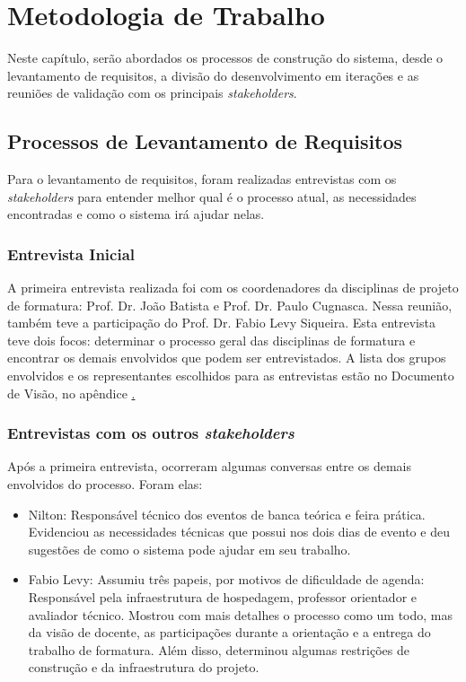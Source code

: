 \chapter{Metodologia de Trabalho}
Neste capítulo, serão abordados os processos de construção do sistema, desde o levantamento de requisitos, a divisão do desenvolvimento em iterações e as reuniões de validação com os principais \textit{stakeholders}.

\section{Processos de Levantamento de Requisitos}
Para o levantamento de requisitos, foram realizadas entrevistas com os \textit{stakeholders} para entender melhor qual é o processo atual, as necessidades encontradas e como o sistema irá ajudar nelas.

\subsection{Entrevista Inicial}
A primeira entrevista realizada foi com os coordenadores da disciplinas de projeto de formatura: Prof. Dr. João Batista e Prof. Dr. Paulo Cugnasca. Nessa reunião, também teve a participação do Prof. Dr. Fabio Levy Siqueira. Esta entrevista teve dois focos: determinar o processo geral das disciplinas de formatura e encontrar os demais envolvidos que podem ser entrevistados. A lista dos grupos envolvidos e os representantes escolhidos para as entrevistas estão no Documento de Visão, no apêndice \href{chap:vision-doc-appendix}.

\subsection{Entrevistas com os outros \textit{stakeholders}}
Após a primeira entrevista, ocorreram algumas conversas entre os demais envolvidos do processo. Foram elas:

\begin{itemize}
    \item Nilton: Responsável técnico dos eventos de banca teórica e feira prática. Evidenciou as necessidades técnicas que possui nos dois dias de evento e deu sugestões de como o sistema pode ajudar em seu trabalho.
    \item Fabio Levy: Assumiu três papeis, por motivos de dificuldade de agenda: Responsável pela infraestrutura de hospedagem, professor orientador e avaliador técnico. Mostrou com mais detalhes o processo como um todo, mas da visão de docente, as participações durante a orientação e a entrega do trabalho de formatura. Além disso, determinou algumas restrições de construção e da infraestrutura do projeto.
\end{itemize}

